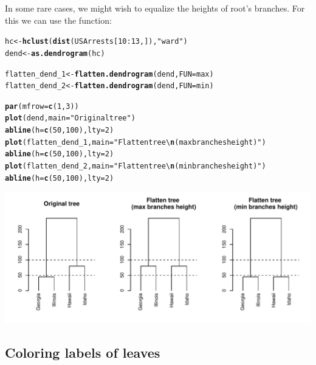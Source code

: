 \documentclass[shortnames,nojss,article]{jss}\usepackage{graphicx, color}
\makeatletter
\def\maxwidth{ %
  \ifdim\Gin@nat@width>\linewidth
    \linewidth
  \else
    \Gin@nat@width
  \fi
}
\newcommand{\hlfunctioncall}[1]{\textcolor[rgb]{0.501960784313725,0,0.329411764705882}{\textbf{#1}}}%
\newcommand{\hlstring}[1]{\textcolor[rgb]{0.6,0.6,1}{#1}}%
\newenvironment{kframe}{%
 \def\at@end@of@kframe{}%
 \ifinner\ifhmode%
  \def\at@end@of@kframe{\end{minipage}}%
  \begin{minipage}{\columnwidth}%
 \fi\fi%
 \def\FrameCommand##1{\hskip\@totalleftmargin \hskip-\fboxsep
 \colorbox{shadecolor}{##1}\hskip-\fboxsep
     \hskip-\linewidth \hskip-\@totalleftmargin \hskip\columnwidth}%
 \MakeFramed {\advance\hsize-\width
   \@totalleftmargin\z@ \linewidth\hsize
   \@setminipage}}%
 {\par\unskip\endMakeFramed%
 \at@end@of@kframe}
\newenvironment{knitrout}{}{} %
\makeatother
\begin{document}
In some rare cases, we might wish to equalize the heights of root's branches. For this we can use the  function:


\begin{knitrout}
\color{fgcolor}\begin{kframe}
\begin{alltt}

hc <- \hlfunctioncall{hclust}(\hlfunctioncall{dist}(USArrests[10:13, ]), \hlstring{"ward"})
dend <- \hlfunctioncall{as.dendrogram}(hc)

flatten_dend_1 <- \hlfunctioncall{flatten.dendrogram}(dend, FUN = max)
flatten_dend_2 <- \hlfunctioncall{flatten.dendrogram}(dend, FUN = min)

\hlfunctioncall{par}(mfrow = \hlfunctioncall{c}(1, 3))
\hlfunctioncall{plot}(dend, main = \hlstring{"Original tree"})
\hlfunctioncall{abline}(h = \hlfunctioncall{c}(50, 100), lty = 2)
\hlfunctioncall{plot}(flatten_dend_1, main = \hlstring{"Flatten tree \textbackslash{}\hlfunctioncall{n}(max branches height)"})
\hlfunctioncall{abline}(h = \hlfunctioncall{c}(50, 100), lty = 2)
\hlfunctioncall{plot}(flatten_dend_2, main = \hlstring{"Flatten tree \textbackslash{}\hlfunctioncall{n}(min branches height)"})
\hlfunctioncall{abline}(h = \hlfunctioncall{c}(50, 100), lty = 2)
\end{alltt}
\end{kframe}

{\centering \includegraphics[width=\maxwidth]{figure/unnamed-chunk-22} 

}



\end{knitrout}





\subsection{Coloring labels of leaves}
\end{document}

